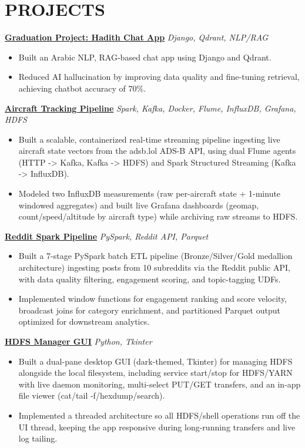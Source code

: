 \documentclass[10pt,letterpaper]{article}
\newcommand{\resumeItem}[1]{%
    \item\small{#1}
}
\newcommand{\resumeProjectHeading}[2]{%
    \vspace{2pt}
    \textbf{#1} \hfill \textit{\small #2}
    \vspace{1pt}
}
\newcommand{\resumeItemListStart}{\begin{itemize}}
\newcommand{\resumeItemListEnd}{\end{itemize}\vspace{2pt}}
\newcommand{\resumeSection}[1]{\section{\texorpdfstring{\MakeUppercase{#1}}{#1}}}
\begin{document}
\resumeSection{Projects}

\resumeProjectHeading
    {\href{https://github.com/Eng-Zakaria/Hadith_Chat_App}{Graduation Project: Hadith Chat App}}
    {Django, Qdrant, NLP/RAG}
\resumeItemListStart
    \resumeItem{Built an Arabic NLP, RAG-based chat app using Django and Qdrant.}
    \resumeItem{Reduced AI hallucination by improving data quality and fine-tuning retrieval, achieving chatbot accuracy of 70\%.}
\resumeItemListEnd

\resumeProjectHeading
    {\href{https://github.com/Eng-Zakaria/aircraft-tracking-pipeline}{Aircraft Tracking Pipeline}}
    {Spark, Kafka, Docker, Flume, InfluxDB, Grafana, HDFS}
\resumeItemListStart
    \resumeItem{Built a scalable, containerized real-time streaming pipeline ingesting live aircraft state vectors from the adsb.lol ADS-B API, using dual Flume agents (HTTP -> Kafka, Kafka -> HDFS) and Spark Structured Streaming (Kafka -> InfluxDB).}
    \resumeItem{Modeled two InfluxDB measurements (raw per-aircraft state + 1-minute windowed aggregates) and built live Grafana dashboards (geomap, count/speed/altitude by aircraft type) while archiving raw streams to HDFS.}
\resumeItemListEnd

\resumeProjectHeading
    {\href{https://github.com/Eng-Zakaria/reddit-spark-pipeline}{Reddit Spark Pipeline}}
    {PySpark, Reddit API, Parquet}
\resumeItemListStart
    \resumeItem{Built a 7-stage PySpark batch ETL pipeline (Bronze/Silver/Gold medallion architecture) ingesting posts from 10 subreddits via the Reddit public API, with data quality filtering, engagement scoring, and topic-tagging UDFs.}
    \resumeItem{Implemented window functions for engagement ranking and score velocity, broadcast joins for category enrichment, and partitioned Parquet output optimized for downstream analytics.}
\resumeItemListEnd

\resumeProjectHeading
    {\href{https://github.com/Eng-Zakaria/hdfs-manager-gui-app}{HDFS Manager GUI}}
    {Python, Tkinter}
\resumeItemListStart
    \resumeItem{Built a dual-pane desktop GUI (dark-themed, Tkinter) for managing HDFS alongside the local filesystem, including service start/stop for HDFS/YARN with live daemon monitoring, multi-select PUT/GET transfers, and an in-app file viewer (cat/tail -f/hexdump/search).}
    \resumeItem{Implemented a threaded architecture so all HDFS/shell operations run off the UI thread, keeping the app responsive during long-running transfers and live log tailing.}
\resumeItemListEnd
\end{document}
